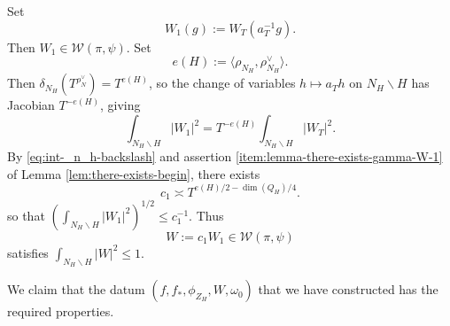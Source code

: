 Set
\begin{equation*}
  W_1(g) := W_T(a_T^{-1} g).
\end{equation*}
Then $W_1 \in \mathcal{W}(\pi,\psi)$.  Set
\begin{equation*}
  e(H) := \langle \rho_{N_H}, \rho_{N_H}^\vee  \rangle.
\end{equation*}
Then $\delta_{N_H}(T^{\rho_N^\vee}) = T^{e(H)}$, so the change of variables $h \mapsto a_T h$ on $N_H \backslash H$ has Jacobian $T^{-e(H)}$, giving
\begin{equation}\label{eq:int-_n_h-backslash}
  \int_{N_H \backslash H} |W_1|^2
  =
  T^{-e(H)}
  \int_{N_H \backslash H} |W_T|^2.
\end{equation}
By \eqref{eq:int-_n_h-backslash} and assertion \eqref{item:lemma-there-exists-gamma-W-1} of Lemma \ref{lem:there-exists-begin}, there exists
\begin{equation*}
  c_1 \asymp  T^{e(H)/2 - \dim(Q_H)/4}.
\end{equation*}
so that $(\int_{N_H \backslash H} |W_1|^2)^{1/2} \leq c_1^{-1}$.  Thus
\begin{equation*}
  W := c_1 W_1 \in \mathcal{W}(\pi,\psi)
\end{equation*}
satisfies $\int_{N_H \backslash H} |W|^2 \leq 1$.

We claim that the datum $(f, f_{\ast}, \phi_{Z_H}, W, \omega_0)$ that we have constructed has the required properties.

